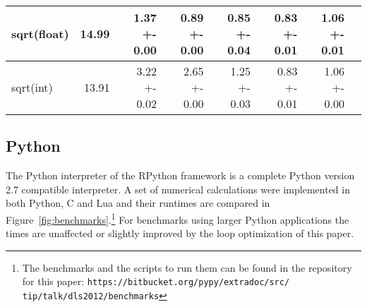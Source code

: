 \documentclass[preprint]{sigplanconf}
\begin{document}
\begin{figure*}
\begin{center}
{\begin{tabular}{|l|r|r|r|r|r|r|r|}
\hline
sqrt(float) & 14.99 & 1.37 +- 0.00 & 0.89 +- 0.00 & 0.85 +- 0.04 & 0.83 +- 0.01 & 1.06 +- 0.01\\
\hline
sqrt(int) & 13.91 & 3.22 +- 0.02 & 2.65 +- 0.00 & 1.25 +- 0.03 & 0.83 +- 0.01 & 1.06 +- 0.00\\
\hline
\end{tabular}
}
\end{center}
\label{fig:benchmarks}
\caption{Benchmark Results in Seconds. Arrays of length $10^5$ and
  $10^6$ and matrices of size $1000\times 1000$ and $1000000 \times
  3$ are used. The one used in each benchmark is indicated in
  the leftmost column. For the matrices, only the number of rows are
  specified.} 
\end{figure*}

\subsection{Python}
The Python interpreter of the RPython framework is a complete Python
version 2.7 compatible interpreter. A set of numerical
calculations were implemented in both Python, C and Lua and their
runtimes are compared in Figure~\ref{fig:benchmarks}.\footnote{
    The benchmarks and the scripts to run them can be found in the repository for this paper:
    \texttt{https://bitbucket.org/pypy/extradoc/src/ tip/talk/dls2012/benchmarks}
}
For benchmarks using larger Python applications the times are unaffected or
slightly improved by the loop optimization of this paper.
\end{document}
